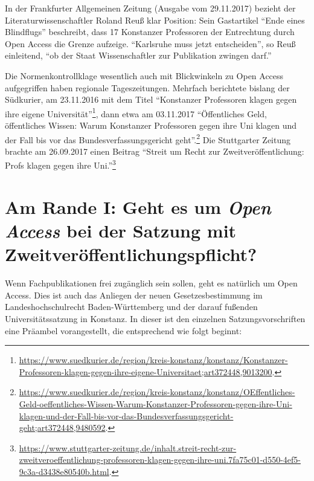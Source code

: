\documentclass[a4paper,
fontsize=11pt,
oneside,
numbers=noperiodatend,
parskip=half-,
bibliography=totoc,
final
]{scrartcl}
\begin{document}
In der Frankfurter Allgemeinen Zeitung (Ausgabe vom 29.11.2017) bezieht
der Literaturwissenschaftler Roland Reuß klar Position: Sein Gastartikel
\enquote{Ende eines Blindflugs} beschreibt, dass 17 Konstanzer
Professoren der Entrechtung durch Open Access die Grenze aufzeige.
\enquote{Karlsruhe muss jetzt entscheiden}, so Reuß einleitend,
\enquote{ob der Staat Wissenschaftler zur Publikation zwingen darf.}

Die Normenkontrollklage wesentlich auch mit Blickwinkeln zu Open Access
aufgegriffen haben regionale Tageszeitungen. Mehrfach berichtete bislang
der Südkurier, am 23.11.2016 mit dem Titel \enquote{Konstanzer
Professoren klagen gegen ihre eigene Universität}\footnote{\url{https://www.suedkurier.de/region/kreis-konstanz/konstanz/Konstanzer-Professoren-klagen-gegen-ihre-eigene-Universitaet;art372448,9013200}.},
dann etwa am 03.11.2017 \enquote{Öffentliches Geld, öffentliches Wissen:
Warum Konstanzer Professoren gegen ihre Uni klagen und der Fall bis vor
das Bundesverfassungsgericht geht}.\footnote{\url{https://www.suedkurier.de/region/kreis-konstanz/konstanz/OEffentliches-Geld-oeffentliches-Wissen-Warum-Konstanzer-Professoren-gegen-ihre-Uni-klagen-und-der-Fall-bis-vor-das-Bundesverfassungsgericht-geht;art372448,9480592}.}
Die Stuttgarter Zeitung brachte am 26.09.2017 einen Beitrag
\enquote{Streit um Recht zur Zweitveröffentlichung: Profs klagen gegen
ihre Uni.}\footnote{\url{https://www.stuttgarter-zeitung.de/inhalt.streit-recht-zur-zweitveroeffentlichung-professoren-klagen-gegen-ihre-uni.7fa75c01-d550-4ef5-9c3a-d3438e80540b.html}.}

\hypertarget{am-rande-i-geht-es-um-open-access-bei-der-satzung-mit-zweitveruxf6ffentlichungspflicht}{%
\section*{\texorpdfstring{Am Rande I: Geht es um \emph{Open Access}
bei der Satzung mit
Zweit\-ver\-öffent\-lich\-ungs\-pflicht?}{Am Rande I: Geht es um Open Access bei der Satzung mit Zweit\-ver\-öffent\-lich\-ungs\-pflicht?}}\label{am-rande-i-geht-es-um-open-access-bei-der-satzung-mit-zweitveruxf6ffentlichungspflicht}}

Wenn Fachpublikationen frei zugänglich sein sollen, geht es natürlich um
Open Access. Dies ist auch das Anliegen der neuen Gesetzesbestimmung im
Landeshochschulrecht Baden-Württemberg und der darauf fußenden
Universitätssatzung in Konstanz. In dieser ist den einzelnen
Satzungsvorschriften eine Präambel vorangestellt, die entsprechend wie
folgt beginnt:
\end{document}
